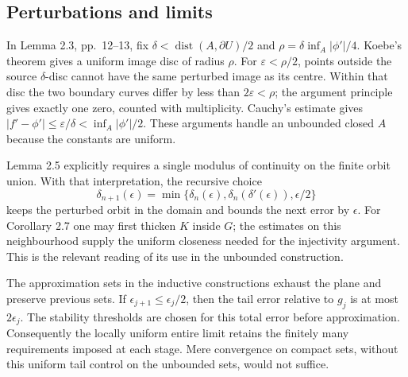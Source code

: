 \documentclass[10pt]{article}
\begin{document}
\subsection*{Perturbations and limits}
In Lemma 2.3, pp. 12–13, fix \(\delta<\operatorname{dist}(A,\partial U)/2\) and \(\rho=\delta\inf_A|\phi'|/4\). Koebe’s theorem gives a uniform image disc of radius \(\rho\). For \(\varepsilon<\rho/2\), points outside the source \(\delta\)-disc cannot have the same perturbed image as its centre. Within that disc the two boundary curves differ by less than \(2\varepsilon<\rho\); the argument principle gives exactly one zero, counted with multiplicity. Cauchy’s estimate gives \(|f'-\phi'|\leq\varepsilon/\delta<\inf_A|\phi'|/2\). These arguments handle an unbounded closed \(A\) because the constants are uniform.\par
Lemma 2.5 explicitly requires a single modulus of continuity on the finite orbit union. With that interpretation, the recursive choice \[\delta_{n+1}(\epsilon)=
 \min\{\delta_n(\epsilon),\delta_n(\delta'(\epsilon)),\epsilon/2\}\] keeps the perturbed orbit in the domain and bounds the next error by \(\epsilon\). For Corollary 2.7 one may first thicken \(K\) inside \(G\); the estimates on this neighbourhood supply the uniform closeness needed for the injectivity argument. This is the relevant reading of its use in the unbounded construction.\par
The approximation sets in the inductive constructions exhaust the plane and preserve previous sets. If \(\epsilon_{j+1}\leq\epsilon_j/2\), then the tail error relative to \(g_j\) is at most \(2\epsilon_j\). The stability thresholds are chosen for this total error before approximation. Consequently the locally uniform entire limit retains the finitely many requirements imposed at each stage. Mere convergence on compact sets, without this uniform tail control on the unbounded sets, would not suffice.\par
\end{document}
